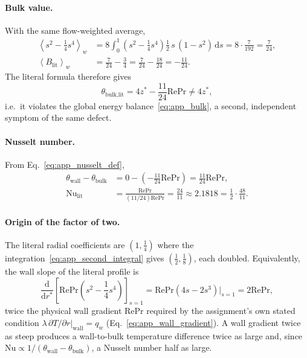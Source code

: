 \documentclass[12pt,a4paper]{article}
\newcommand{\Rey}{\text{Re}}
\newcommand{\Pran}{\text{Pr}}
\begin{document}
\paragraph{Bulk value.} With the same flow-weighted average,
\begin{align}
    \left\langle s^2-\frac14 s^4 \right\rangle_w
    &= 8\int_0^1\left(s^2-\frac14 s^4\right)\frac12\,s\,(1-s^2)\,\mathrm{d}s
     = 8\cdot\frac{7}{192} = \frac{7}{24},\\
    \left\langle B_{\text{lit}} \right\rangle_w
    &= \frac{7}{24}-\frac34 = \frac{7}{24}-\frac{18}{24} = -\frac{11}{24}.
\end{align}
The literal formula therefore gives
\begin{equation}
    \theta_{\text{bulk,lit}} = 4z^* - \frac{11}{24}\Rey\Pran \neq 4z^*,
\end{equation}
i.e.\ it violates the global energy balance~\eqref{eq:app_bulk}, a second, independent symptom of
the same defect.

\paragraph{Nusselt number.} From Eq.~\eqref{eq:app_nusselt_def},
\begin{align}
    \theta_{\text{wall}}-\theta_{\text{bulk}}
    &= 0-\left(-\frac{11}{24}\Rey\Pran\right) = \frac{11}{24}\Rey\Pran,\\
    \text{Nu}_{\text{lit}} &= \frac{\Rey\Pran}{(11/24)\Rey\Pran}
    = \frac{24}{11} \approx 2.1818 = \frac12\cdot\frac{48}{11}.
\end{align}

\paragraph{Origin of the factor of two.} The literal radial coefficients are $(1,\tfrac14)$ where
the integration~\eqref{eq:app_second_integral} gives $(\tfrac12,\tfrac18)$, each doubled.
Equivalently, the wall slope of the literal profile is
\begin{equation}
    \frac{\mathrm{d}}{\mathrm{d}r^*}\left[\Rey\Pran\left(s^2-\frac14 s^4\right)\right]_{s=1}
    = \Rey\Pran\left(4s-2s^3\right)\Big|_{s=1}
    = 2\Rey\Pran ,
\end{equation}
twice the physical wall gradient $\Rey\Pran$ required by the assignment's own stated condition
$\lambda\,\partial T/\partial r|_{\text{wall}}=q_w$ (Eq.~\eqref{eq:app_wall_gradient}). A wall
gradient twice as steep produces a wall-to-bulk temperature difference twice as large and, since
$\text{Nu}\propto1/(\theta_{\text{wall}}-\theta_{\text{bulk}})$, a Nusselt number half as large.
\end{document}

